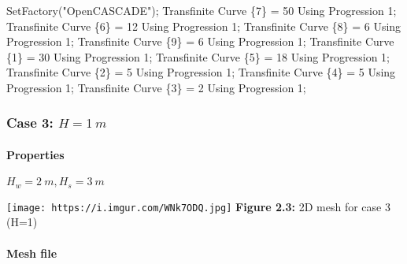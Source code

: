 \documentclass[11pt]{article}
\newenvironment{Shaded}{}{}
\newcommand{\DecValTok}[1]{\textcolor[rgb]{0.25,0.63,0.44}{{#1}}}
\newcommand{\StringTok}[1]{\textcolor[rgb]{0.25,0.44,0.63}{{#1}}}
\newcommand{\NormalTok}[1]{{#1}}
\newcommand{\OperatorTok}[1]{\textcolor[rgb]{0.40,0.40,0.40}{{#1}}}
\begin{document}
\begin{Shaded}
\begin{Highlighting}[]
\NormalTok{SetFactory}\OperatorTok{(}\StringTok{"OpenCASCADE"}\OperatorTok{);}
\NormalTok{Transfinite Curve }\OperatorTok{\{}\DecValTok{7}\OperatorTok{\}} \OperatorTok{=} \DecValTok{50}\NormalTok{ Using Progression }\DecValTok{1}\OperatorTok{;}
\NormalTok{Transfinite Curve }\OperatorTok{\{}\DecValTok{6}\OperatorTok{\}} \OperatorTok{=} \DecValTok{12}\NormalTok{ Using Progression }\DecValTok{1}\OperatorTok{;}
\NormalTok{Transfinite Curve }\OperatorTok{\{}\DecValTok{8}\OperatorTok{\}} \OperatorTok{=} \DecValTok{6}\NormalTok{ Using Progression }\DecValTok{1}\OperatorTok{;}
\NormalTok{Transfinite Curve }\OperatorTok{\{}\DecValTok{9}\OperatorTok{\}} \OperatorTok{=} \DecValTok{6}\NormalTok{ Using Progression }\DecValTok{1}\OperatorTok{;}
\NormalTok{Transfinite Curve }\OperatorTok{\{}\DecValTok{1}\OperatorTok{\}} \OperatorTok{=} \DecValTok{30}\NormalTok{ Using Progression }\DecValTok{1}\OperatorTok{;}
\NormalTok{Transfinite Curve }\OperatorTok{\{}\DecValTok{5}\OperatorTok{\}} \OperatorTok{=} \DecValTok{18}\NormalTok{ Using Progression }\DecValTok{1}\OperatorTok{;}
\NormalTok{Transfinite Curve }\OperatorTok{\{}\DecValTok{2}\OperatorTok{\}} \OperatorTok{=} \DecValTok{5}\NormalTok{ Using Progression }\DecValTok{1}\OperatorTok{;}
\NormalTok{Transfinite Curve }\OperatorTok{\{}\DecValTok{4}\OperatorTok{\}} \OperatorTok{=} \DecValTok{5}\NormalTok{ Using Progression }\DecValTok{1}\OperatorTok{;}
\NormalTok{Transfinite Curve }\OperatorTok{\{}\DecValTok{3}\OperatorTok{\}} \OperatorTok{=} \DecValTok{2}\NormalTok{ Using Progression }\DecValTok{1}\OperatorTok{;}
\end{Highlighting}
\end{Shaded}

\hypertarget{case-3-h-1-m}{%
\subsubsection{\texorpdfstring{Case 3:
\(H = 1\ m\)}{Case 3: H = 1\textbackslash{} m}}\label{case-3-h-1-m}}

\hypertarget{properties-3}{%
\paragraph{Properties}\label{properties-3}}

\(H_w = 2\ m, H_s = 3\ m\)

\texttt{[image: https://i.imgur.com/WNk7ODQ.jpg]} \textbf{Figure 2.3:}
2D mesh for case 3 (H=1)

\hypertarget{mesh-file-2}{%
\paragraph{Mesh file}\label{mesh-file-2}}
\end{document}
